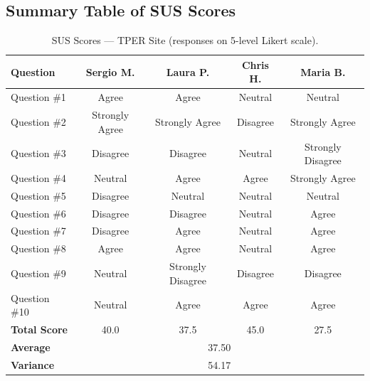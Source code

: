 ﻿\documentclass[11pt,a4paper]{article}
\begin{document}
\vspace{1cm}

\subsection*{Summary Table of SUS Scores}

\begin{table}[ht]
\centering
\label{tab:sus_scores}
\renewcommand{\arraystretch}{1.3}
\begin{tabular}{|l|c|c|c|c|}
\hline
\textbf{Question} & \textbf{Sergio M.} & \textbf{Laura P.} & \textbf{Chris H.} & \textbf{Maria B.} \\ \hline
Question \#1      & Agree          & Agree          & Neutral        & Neutral          \\ \hline
Question \#2      & Strongly Agree & Strongly Agree & Disagree       & Strongly Agree   \\ \hline
Question \#3      & Disagree       & Disagree       & Neutral        & Strongly Disagree \\ \hline
Question \#4      & Neutral        & Agree          & Agree          & Strongly Agree   \\ \hline
Question \#5      & Disagree       & Neutral        & Neutral        & Neutral          \\ \hline
Question \#6      & Disagree       & Disagree       & Neutral        & Agree            \\ \hline
Question \#7      & Disagree       & Agree          & Neutral        & Agree            \\ \hline
Question \#8      & Agree          & Agree          & Neutral        & Agree            \\ \hline
Question \#9      & Neutral        & Strongly Disagree & Disagree    & Disagree         \\ \hline
Question \#10     & Neutral        & Agree          & Agree          & Agree            \\ \hline
\textbf{\hfill Total Score} & 40.0   & 37.5          & 45.0          & 27.5             \\ \hline
\textbf{\hfill Average}     & \multicolumn{4}{c|}{37.50}                               \\ \hline
\textbf{\hfill Variance}    & \multicolumn{4}{c|}{54.17}                               \\ \hline
\end{tabular}
\caption{SUS Scores --- TPER Site (responses on 5-level Likert scale).}
\end{table}
\end{document}
